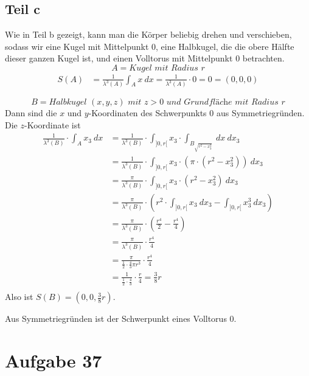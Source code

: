 \documentclass[10pt,a4paper]{article}
\begin{document}
\subsection{Teil c}
Wie in Teil b gezeigt, kann man die Körper beliebig drehen und verschieben, sodass wir eine Kugel mit Mittelpunkt $0$, eine Halbkugel, die die obere Hälfte dieser ganzen Kugel ist, und einen Volltorus mit Mittelpunkt $0$ betrachten.
\begin{equation}
  A = \textit{Kugel mit Radius $r$}
\end{equation}
\begin{align*}
  S(A) & = \frac{1}{\lambda^{3}(A)} \int_{A} x\ dx = \frac{1}{\lambda^{3}(A)} \cdot 0 = 0 = (0, 0, 0)
\end{align*}

\begin{equation}
  B = \textit{Halbkugel $(x, y, z)$ mit $z > 0$ und Grundfläche mit Radius $r$}
\end{equation}
Dann sind die $x$ und $y$-Koordinaten des Schwerpunkts $0$ aus Symmetriegründen.
Die $z$-Koordinate ist
\begin{align*}
  \frac{1}{\lambda^{3}(B)} \cdot \int_{A} x_{3}\ dx & = \frac{1}{\lambda^{3}(B)} \cdot \int_{]0, r[} x_{3} \cdot \int_{B_{\sqrt{r^{2} - x_{3}^{2}}}}\ dx\ dx_{3}\\
  & = \frac{1}{\lambda^{3}(B)} \cdot \int_{]0, r[} x_{3} \cdot (\pi \cdot (r^{2} - x_{3}^{2}))\ dx_{3}\\
  & = \frac{\pi}{\lambda^{3}(B)} \cdot \int_{]0, r[} x_{3} \cdot (r^{2} - x_{3}^{2})\ dx_{3}\\
  & = \frac{\pi}{\lambda^{3}(B)} \cdot \left( r^{2} \cdot \int_{]0, r[} x_{3}\ dx_{3} -  \int_{]0, r[} x_{3}^{3}\ dx_{3} \right)\\
  & = \frac{\pi}{\lambda^{3}(B)} \cdot \left( \frac{r^{4}}{2} - \frac{r^{4}}{4} \right)\\
  & = \frac{\pi}{\lambda^{3}(B)} \cdot \frac{r^{4}}{4}\\
  & = \frac{\pi}{\frac{1}{2} \cdot \frac{4}{3} \pi r^{3}} \cdot \frac{r^{4}}{4}\\
  & = \frac{1}{\frac{1}{2} \cdot \frac{4}{3}} \cdot \frac{r}{4} = \frac{3}{8}r\\
\end{align*}
Also ist $S(B) = (0, 0, \frac{3}{8}r)$.

Aus Symmetriegründen ist der Schwerpunkt eines Volltorus $0$.

\section{Aufgabe 37}
\end{document}
